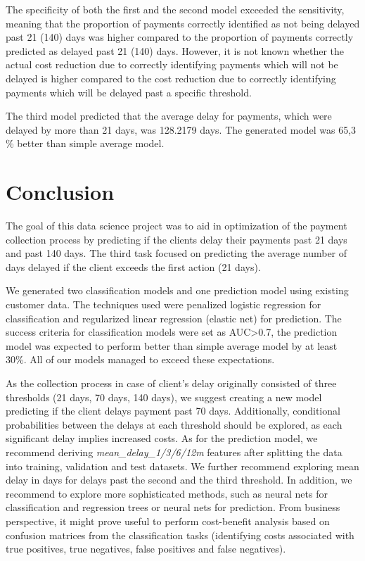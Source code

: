\documentclass[
]{article}
\begin{document}
The specificity of both the first and the second model exceeded the sensitivity, meaning that the proportion of payments correctly identified as not being delayed past 21 (140) days was higher compared to the proportion of payments correctly predicted as delayed past 21 (140) days. However, it is not known whether the actual cost reduction due to correctly identifying payments which will not be delayed is higher compared to the cost reduction due to correctly identifying payments which will be delayed past a specific threshold.

The third model predicted that the average delay for payments, which were delayed by more than 21 days, was 128.2179 days. The generated model was 65,3 \% better than simple average model.

\hypertarget{conclusion}{%
\section{Conclusion}\label{conclusion}}

The goal of this data science project was to aid in optimization of the payment collection process by predicting if the clients delay their payments past 21 days and past 140 days. The third task focused on predicting the average number of days delayed if the client exceeds the first action (21 days).

We generated two classification models and one prediction model using existing customer data. The techniques used were penalized logistic regression for classification and regularized linear regression (elastic net) for prediction. The success criteria for classification models were set as AUC\textgreater0.7, the prediction model was expected to perform better than simple average model by at least 30\%. All of our models managed to exceed these expectations.

As the collection process in case of client's delay originally consisted of three thresholds (21 days, 70 days, 140 days), we suggest creating a new model predicting if the client delays payment past 70 days. Additionally, conditional probabilities between the delays at each threshold should be explored, as each significant delay implies increased costs. As for the prediction model, we recommend deriving \emph{mean\_delay\_1/3/6/12m} features after splitting the data into training, validation and test datasets. We further recommend exploring mean delay in days for delays past the second and the third threshold.
In addition, we recommend to explore more sophisticated methods, such as neural nets for classification and regression trees or neural nets for prediction. From business perspective, it might prove useful to perform cost-benefit analysis based on confusion matrices from the classification tasks (identifying costs associated with true positives, true negatives, false positives and false negatives).
\end{document}
